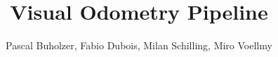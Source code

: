 \documentclass[a4paper,10pt]{article} %
\begin{document}
\title{Visual Odometry Pipeline}
\author{Pascal Buholzer, Fabio Dubois, Milan Schilling, Miro Voellmy}
\maketitle

\newpage

\newpage

\tableofcontents
\newpage

\newpage

\newpage

\newpage



\newpage
%
\end{document}
